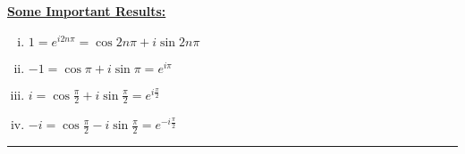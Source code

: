 \begin{note}{}{}
    \underline{\textbf{Some Important Results:}}
    \begin{enumerate}[(i)]
        \item $1 = e^{i2n\pi} = \cos{2n\pi} + i\sin{2n\pi}$
        \item $-1 = \cos\pi + i\sin\pi = e^{i\pi}$ 
        \item $i = \cos\frac{\pi}{2} + i\sin\frac{\pi}{2} = e^{i\frac{\pi}{2}}$
        \item $-i = \cos\frac{\pi}{2} - i\sin\frac{\pi}{2} = e^{-i\frac{\pi}{2}}$
    \end{enumerate}
\end{note}

\vspace{20pt}\rule{3in}{1pt}
